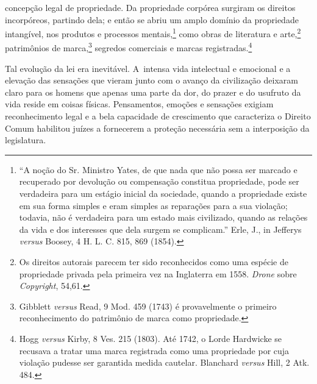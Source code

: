 concepção legal de propriedade. Da propriedade corpórea surgiram os
direitos incorpóreos, partindo dela; e então se abriu um amplo domínio
da propriedade intangível, nos produtos e processos mentais,\footnote{``A
  noção do Sr. Ministro Yates, de que nada que não possa ser marcado e
  recuperado por devolução ou compensação constitua propriedade, pode
  ser verdadeira para um estágio inicial da sociedade, quando a
  propriedade existe em sua forma simples e eram simples as reparações
  para a sua violação; todavia, não é verdadeira para um estado mais
  civilizado, quando as relações da vida e dos interesses que dela
  surgem se complicam.'' Erle, J., in Jefferys \emph{versus} Boosey, 4
  H. L. C. 815, 869 (1854).} como obras de literatura e arte,\footnote{Os
  direitos autorais parecem ter sido reconhecidos como uma espécie de
  propriedade privada pela primeira vez na Inglaterra em 1558.
  \emph{Drone} sobre \emph{Copyright}, 54,61.} patrimônios de
marca,\footnote{Gibblett \emph{versus} Read, 9 Mod. 459 (1743) é
  provavelmente o primeiro reconhecimento do patrimônio de marca como
  propriedade.} segredos comerciais e marcas registradas.\footnote{Hogg
  \emph{versus} Kirby, 8 Ves. 215 (1803). Até 1742, o Lorde Hardwicke se
  recusava a tratar uma marca registrada como uma propriedade por cuja
  violação pudesse ser garantida medida cautelar. Blanchard
  \emph{versus} Hill, 2 Atk. 484.}

Tal evolução da lei era inevitável. A~intensa vida intelectual e
emocional e a elevação das sensações que vieram junto com o avanço da
civilização deixaram claro para os homens que apenas uma parte da dor,
do prazer e do usufruto da vida reside em coisas físicas. Pensamentos,
emoções e sensações exigiam reconhecimento legal e a bela capacidade de
crescimento que caracteriza o Direito Comum habilitou juízes a
fornecerem a proteção necessária sem a interposição da legislatura.

